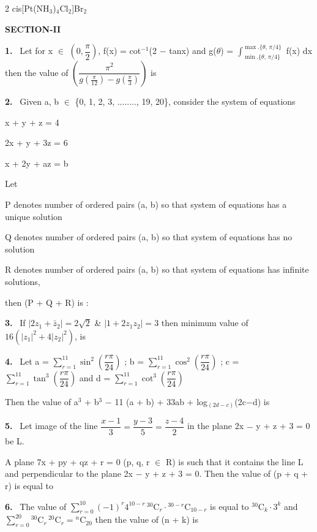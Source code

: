 \documentclass[10pt]{extarticle}
\newcommand{\partsec}[2]{\par\medskip\noindent{\large\bfseries PART-#1: #2}\par\smallskip}
\newcommand{\sect}[1]{\par\smallskip\noindent\textbf{#1}\par}
\newcommand{\qn}[1]{\par\smallskip\noindent\textbf{#1.}~}
\begin{document}
\begin{multicols}{2}
cis[Pt(NH$_3$)$_4$Cl$_2$]Br$_2$\par
\partsec{3}{MATHEMATICS}
\sect{SECTION-II}
\qn{1} Let for x $\in$ $\left(0,\dfrac{\pi}{2}\right)$, f(x) = cot$^{-1}$(2 $-$ tanx) and g($\theta$) = $\displaystyle\int_{\min.\{\theta,\,\pi/4\}}^{\max.\{\theta,\,\pi/4\}}$ f(x) dx then the value of $\left(\dfrac{\pi^2}{g\left(\frac{\pi}{12}\right)-g\left(\frac{\pi}{3}\right)}\right)$ is\par
\qn{2} Given a, b $\in$ \{0, 1, 2, 3, ........, 19, 20\}, consider the system of equations\par
x + y + z = 4\par
2x + y + 3z = 6\par
x + 2y + az = b\par
Let\par
P denotes number of ordered pairs (a, b) so that system of equations has a unique solution\par
Q denotes number of ordered pairs (a, b) so that system of equations has no solution\par
R denotes number of ordered pairs (a, b) so that system of equations has infinite solutions,\par
then (P + Q + R) is :\par
\qn{3} If $|2z_1+\bar{z}_2| = 2\sqrt{2}$ \& $|1+2z_1z_2| = 3$ then minimum value of $16(|z_1|^2+4|z_2|^2)$, is\par
\qn{4} Let a = $\displaystyle\sum_{r=1}^{11}\sin^2\left(\dfrac{r\pi}{24}\right)$ ; b = $\displaystyle\sum_{r=1}^{11}\cos^2\left(\dfrac{r\pi}{24}\right)$ ; c = $\displaystyle\sum_{r=1}^{11}\tan^3\left(\dfrac{r\pi}{24}\right)$ and d = $\displaystyle\sum_{r=1}^{11}\cot^3\left(\dfrac{r\pi}{24}\right)$\par
Then the value of a$^3$ + b$^3$ $-$ 11 (a + b) + 33ab + log$_{(2d-c)}$(2c$-$d) is\par
\qn{5} Let image of the line $\dfrac{x-1}{3}=\dfrac{y-3}{5}=\dfrac{z-4}{2}$ in the plane 2x $-$ y + z + 3 = 0 be L.\par
A plane 7x + py + qz + r = 0 (p, q, r $\in$ R) is such that it contains the line L and perpendicular to the plane 2x $-$ y + z + 3 = 0. Then the value of (p + q + r) is equal to\par
\qn{6} The value of $\displaystyle\sum_{r=0}^{10}(-1)^r4^{10-r}\,{}^{30}\mathrm{C}_r\cdot{}^{30-r}\mathrm{C}_{10-r}$ is equal to ${}^{30}\mathrm{C}_k\cdot 3^k$ and $\displaystyle\sum_{r=0}^{20}{}^{30}\mathrm{C}_r\,{}^{20}\mathrm{C}_r={}^{n}\mathrm{C}_{20}$ then the value of (n + k) is\par

\end{multicols}
\end{document}
